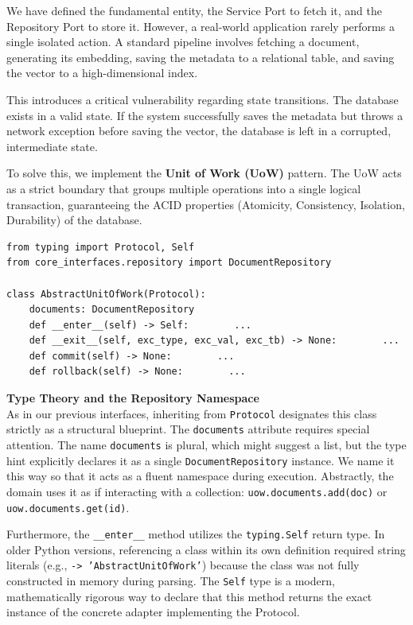 We have defined the fundamental entity, the Service Port to fetch it, and the Repository Port to store it. However, a real-world application rarely performs a single isolated action. A standard pipeline involves fetching a document, generating its embedding, saving the metadata to a relational table, and saving the vector to a high-dimensional index.

This introduces a critical vulnerability regarding state transitions. The database exists in a valid state. If the system successfully saves the metadata but throws a network exception before saving the vector, the database is left in a corrupted, intermediate state.

To solve this, we implement the \textbf{Unit of Work (UoW)} pattern. The UoW acts as a strict boundary that groups multiple operations into a single logical transaction, guaranteeing the ACID properties (Atomicity, Consistency, Isolation, Durability) of the database.

\begin{lstlisting}[caption={The Unit of Work Protocol}]
from typing import Protocol, Self
from core_interfaces.repository import DocumentRepository

class AbstractUnitOfWork(Protocol):
    documents: DocumentRepository
    def __enter__(self) -> Self:        ...
    def __exit__(self, exc_type, exc_val, exc_tb) -> None:        ...
    def commit(self) -> None:        ...
    def rollback(self) -> None:        ...
\end{lstlisting}

\textbf{Type Theory and the Repository Namespace} \\
As in our previous interfaces, inheriting from \texttt{Protocol} designates this class strictly as a structural blueprint. The \texttt{documents} attribute requires special attention. The name \texttt{documents} is plural, which might suggest a list, but the type hint explicitly declares it as a single \texttt{DocumentRepository} instance. We name it this way so that it acts as a fluent namespace during execution. Abstractly, the domain uses it as if interacting with a collection: \texttt{uow.documents.add(doc)} or \texttt{uow.documents.get(id)}.

Furthermore, the \texttt{\_\_enter\_\_} method utilizes the \texttt{typing.Self} return type. In older Python versions, referencing a class within its own definition required string literals (e.g., \texttt{-> 'AbstractUnitOfWork'}) because the class was not fully constructed in memory during parsing. The \texttt{Self} type is a modern, mathematically rigorous way to declare that this method returns the exact instance of the concrete adapter implementing the Protocol.

